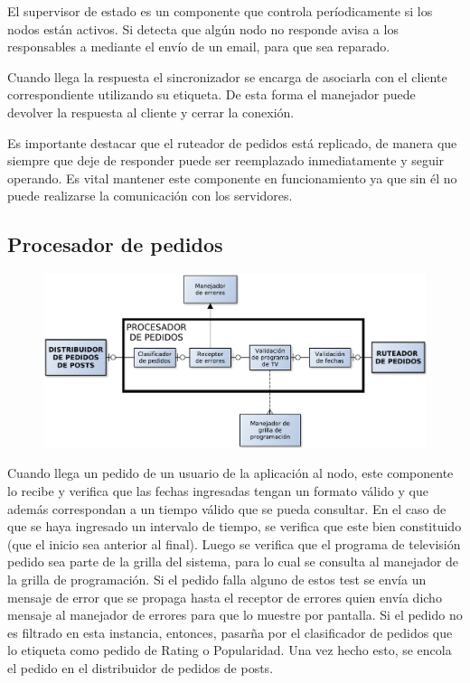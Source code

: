 El supervisor de estado es un componente que controla períodicamente si los nodos están activos. Si detecta que algún nodo no responde avisa a los responsables a mediante el envío de un email, para que sea reparado.

Cuando llega la respuesta el sincronizador se encarga de asociarla con el cliente correspondiente utilizando su etiqueta. De esta forma el manejador puede devolver la respuesta al cliente y cerrar la conexión.

Es importante destacar que el ruteador de pedidos está replicado, de manera que siempre que deje de responder puede ser reemplazado inmediatamente y seguir operando. Es vital mantener este componente en funcionamiento ya que sin él no puede realizarse la comunicación con los servidores.

\subsection{Procesador de pedidos}

\begin{figure}[H]
\centering
\includegraphics[width=\textwidth]{graph/procpedidos.pdf}
\end{figure}

Cuando llega un pedido de un usuario de la aplicación al nodo, este componente lo recibe y verifica que las fechas ingresadas tengan un formato válido y que 
además correspondan a un tiempo válido que se pueda consultar. En el caso de que se haya ingresado un intervalo de tiempo, se verifica que este bien constituido (que el inicio sea anterior al final). Luego se verifica que el programa de televisión pedido sea parte de la grilla del sistema, para lo cual se consulta al manejador de la grilla de programación. Si el pedido falla alguno de estos test se envía un mensaje de error que se propaga hasta el receptor de errores quien envía dicho mensaje al manejador de errores para que lo muestre por pantalla. Si el pedido no es filtrado en esta instancia, entonces, pasarña por el clasificador de pedidos que lo etiqueta como pedido de Rating o Popularidad. Una vez hecho esto, se encola el pedido en el distribuidor de pedidos de posts.

